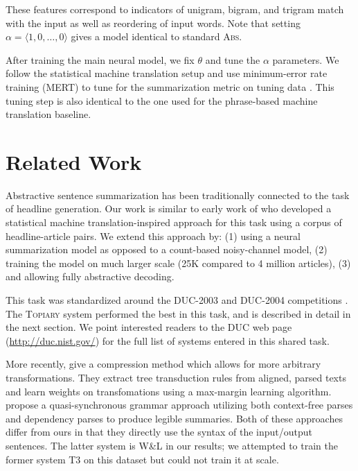 \documentclass[11pt,a4paper]{article}
\begin{document}
\noindent These features correspond to indicators of unigram, bigram, and trigram match with the input as well as reordering of input words. Note that setting $\alpha = \langle 1, 0, \ldots, 0\rangle$ gives a model identical to standard \textsc{Abs}.  



After training the main neural model, we fix $\theta$ and tune the $\alpha$ parameters. We
follow the statistical machine translation setup and use minimum-error
rate training (MERT) to tune for the summarization metric on tuning
data \cite{och2003minimum}. This tuning step is also identical to
the one used for the phrase-based machine translation baseline.

 
\section{Related Work}
\label{sec:related}

Abstractive sentence summarization has been traditionally connected to
the task of headline generation.  Our work is similar to early work of
 who developed a statistical machine
translation-inspired approach for this task using a corpus of
headline-article pairs. We extend this approach by: (1) using a neural
summarization model as opposed to a count-based noisy-channel model, (2)
training the model on much larger scale (25K compared to 4 million
articles), (3) and allowing fully abstractive decoding. 

This task was standardized around the DUC-2003 and DUC-2004
competitions \cite{over2007duc}. The \textsc{Topiary} system
\cite{zajic2004bbn} performed the best in this task, and is described in
detail in the next section.  We point interested readers to the
DUC web page (\url{http://duc.nist.gov/}) for the full list of systems
entered in this shared task.

More recently,  give a compression method
which allows for more arbitrary transformations. They extract tree
transduction rules from aligned, parsed texts and learn weights on
transfomations using a max-margin learning
algorithm.  propose a
quasi-synchronous grammar approach utilizing both
context-free parses and dependency parses to produce legible
summaries. Both of these approaches differ from ours in that they
directly use the syntax of the input/output sentences.  The latter
system is \textsc{W\&L} in our results; we attempted to train the
former system \textsc{T3} on this dataset but could not train it at
scale.
\end{document}
